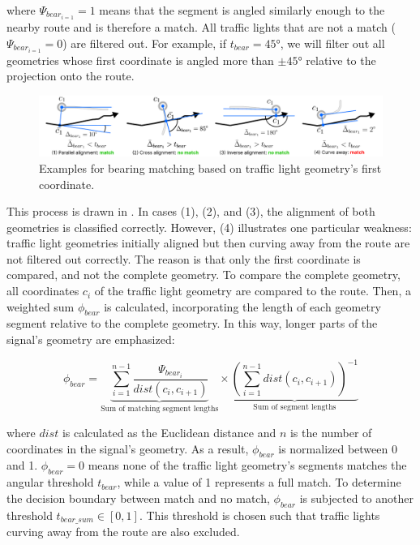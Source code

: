 where $\Psi_{bear_{i=1}} = 1$ means that the segment is angled similarly enough to the nearby route and is therefore a match. All traffic lights that are not a match ($\Psi_{bear_{i=1}} = 0$) are filtered out. For example, if $t_{bear} = 45°$, we will filter out all geometries whose first coordinate is angled more than $\pm 45°$ relative to the projection onto the route. 

\begin{figure}[htbp]
\centering
\includegraphics[width=\linewidth]{images/sg-selection-bearing-filter.pdf}
\caption{Examples for bearing matching based on traffic light geometry's first coordinate.}
\label{fig:sg-selection-bearing-filter}
\end{figure}

This process is drawn in . In cases (1), (2), and (3), the alignment of both geometries is classified correctly. However, (4) illustrates one particular weakness: traffic light geometries initially aligned but then curving away from the route are not filtered out correctly. The reason is that only the first coordinate is compared, and not the complete geometry. To compare the complete geometry, all coordinates $c_i$ of the traffic light geometry are compared to the route. Then, a weighted sum $\phi_{bear}$ is calculated, incorporating the length of each geometry segment relative to the complete geometry. In this way, longer parts of the signal's geometry are emphasized:


\begin{equation} 
\phi_{bear} = 
    \underbrace{\sum_{i=1}^{n-1} 
    \frac{\Psi_{bear_i}}{dist(c_i, c_{i+1})}}_{\text{Sum of matching segment lengths}}
    \times
    \underbrace{(\sum_{i=1}^{n-1} dist(c_i, c_{i+1}))^{-1}}_{\text{Sum of segment lengths}}
\end{equation}

where $dist$ is calculated as the Euclidean distance and $n$ is the number of coordinates in the signal's geometry. As a result, $\phi_{bear}$ is normalized between 0 and 1. $\phi_{bear} = 0$ means none of the traffic light geometry's segments matches the angular threshold $t_{bear}$, while a value of 1 represents a full match. To determine the decision boundary between match and no match, $\phi_{bear}$ is subjected to another threshold $t_{bear\_sum} \in [0, 1]$. This threshold is chosen such that traffic lights curving away from the route are also excluded.

